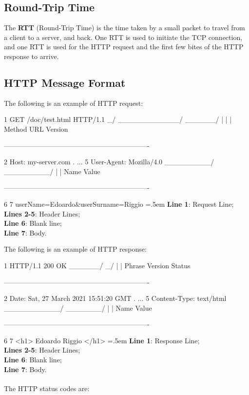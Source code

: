 \documentclass{article}
\newenvironment{lcverbatim}
 {\SaveVerbatim{cverb}}
 {\endSaveVerbatim
  \flushleft\fboxrule=0pt\fboxsep=.5em
  \colorbox{cverbbg}{%
    \makebox[\dimexpr\linewidth-2\fboxsep][l]{\BUseVerbatim{cverb}}%
  }
  \endflushleft
}
\begin{document}
\subsection{Round-Trip Time}
The \textbf{RTT} (Round-Trip Time) is the time taken by a small packet to travel from a client to a server, and back. One RTT is used to initiate the TCP connection, and one RTT is used for the HTTP request and the first few bites of the HTTP response to arrive.

\subsection{HTTP Message Format}

The following is an example of HTTP request:

\begin{lcverbatim}
1  GET /doc/test.html HTTP/1.1
   \_/ \____________/ \______/
    |         |          |
   Method    URL       Version
   
----------------------------------------------------------------

2  Host: my-server.com
.  ...
5  User-Agent: Mozilla/4.0
   \_________/ \_________/
        |           |
       Name       Value
       
----------------------------------------------------------------

6
7  userName=Edoardo&userSurname=Riggio
\end{lcverbatim}
\textbf{Line 1}: Request Line; \\
\textbf{Lines 2-5}: Header Lines; \\
\textbf{Line 6}: Blank line; \\
\textbf{Line 7}: Body.

\pagebreak

\noindent The following  is an example of HTTP response:

\begin{lcverbatim}
1  HTTP/1.1 200 OK
   \______/ \_/ \/
       |     |   Phrase
    Version Status
    
----------------------------------------------------------------

2  Date: Sat, 27 March 2021 15:51:20 GMT
.  ...
5  Content-Type: text/html
   \___________/ \_______/
         |           |
        Name       Value
        
----------------------------------------------------------------

6
7  <h1> Edoardo Riggio </h1>
\end{lcverbatim}
\textbf{Line 1}: Response Line; \\
\textbf{Lines 2-5}: Header Lines; \\
\textbf{Line 6}: Blank line; \\
\textbf{Line 7}: Body. \\ \\
The HTTP status codes are:
\end{document}
